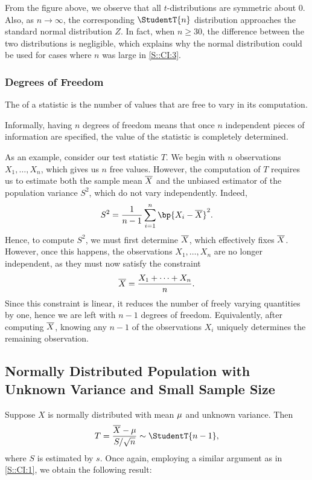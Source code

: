 From the figure above, we observe that all $t$-distributions are symmetric about 0. Also, as $n \to \infty$, the corresponding $\StudentT{n}$ distribution approaches the standard normal distribution $Z$. In fact, when $n \geq 30$, the difference between the two distributions is negligible, which explains why the normal distribution could be used for cases where $n$ was large in \SS\ref{S::CI:3}.

\subsubsection{Degrees of Freedom}

\begin{definition}
    The  of a statistic is the number of values that are free to vary in its computation.
\end{definition}

Informally, having $n$ degrees of freedom means that once $n$ independent pieces of information are specified, the value of the statistic is completely determined.

As an example, consider our test statistic $T$. We begin with $n$ observations $X_1, \dots, X_n$, which gives us $n$ free values. However, the computation of $T$ requires us to estimate both the sample mean $\overline{X}$ and the unbiased estimator of the population variance $S^2$, which do not vary independently. Indeed, \[S^2 = \frac1{n-1} \sum_{i = 1}^n \bp{X_i - \ol{X}}^2.\] Hence, to compute $S^2$, we must first determine $\overline{X}$, which effectively fixes $\overline{X}$. However, once this happens, the observations $X_1, \dots, X_n$ are no longer independent, as they must now satisfy the constraint \[\overline{X} = \frac{X_1 + \dots + X_n}{n}.\] Since this constraint is linear, it reduces the number of freely varying quantities by one, hence we are left with $n-1$ degrees of freedom. Equivalently, after computing $\overline{X}$, knowing any $n-1$ of the observations $X_i$ uniquely determines the remaining observation.

\subsection{Normally Distributed Population with Unknown Variance and Small Sample Size}\label{S::CI:4}

Suppose $X$ is normally distributed with mean $\mu$ and unknown variance. Then \[T = \frac{\ol{X} - \m}{S/\sqrt{n}} \sim \StudentT{n - 1},\] where $S$ is estimated by $s$. Once again, employing a similar argument as in \SS\ref{S::CI:1}, we obtain the following result:

